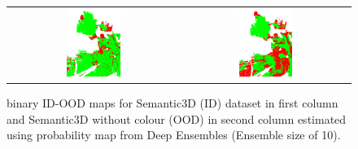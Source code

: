 \begin{figure}[h!]
\begin{tabular}{cc}
            \includegraphics[width=0.33\textwidth, height=0.18\textheight]{images/ood_imgs/sem3d_of/prob/de_sem3d_OOD_3.pdf}&
            \includegraphics[width=0.33\textwidth, height=0.18\textheight]{images/ood_imgs/sem3d_of/prob/de_sem3d_of_OOD_3.pdf}\\
        \end{tabular}
        \caption{binary ID-OOD maps for Semantic3D (ID) dataset in first column and Semantic3D without colour (OOD) in second column estimated using probability map from Deep Ensembles (Ensemble size of 10).}
        \label{fig:de_oodmap_sem3d_OF_prob}
    \end{figure}


